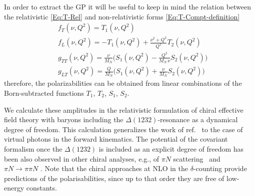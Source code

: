 \documentclass[prc,twocolumn,showpacs,preprintnumbers,amsmath,amssymb
,superscriptaddress,a4paper,nofootinbib
]{revtex4-1}
\begin{document}
In order to extract the GP it will be useful to keep in mind the relation between the relativistic \eqref{Eq:T-Rel} and non-relativistic forms \eqref{Eq:T-Compt-definition}
\begin{align}
 & f_T(\nu,Q^2) = T_1(\nu,Q^2) \label{Eq:fT-T1}\\
 & f_L(\nu,Q^2) = - T_1(\nu,Q^2) +  \frac{\nu^2 + Q^2}{Q^2} T_2(\nu,Q^2) \label{Eq:fL-T1T2}\\
 & g_{TT}(\nu, Q^2) = \frac{\nu}{M_N}\Big( S_1(\nu,Q^2) - \frac{Q^2}{M_N\,\nu} S_2(\nu,Q^2)\Big)\label{Eq:gTT-S1S2}\\
 & g_{LT}(\nu, Q^2) = \frac{Q}{M_N}\Big( S_1(\nu,Q^2) + \frac{\nu}{M_N} S_2(\nu,Q^2)\Big)\label{Eq:gLT-S1S2}
\end{align} 
therefore, the polarizabilities can be obtained from linear combinations of the Born-subtracted functions $T_1$, $T_2$, $S_1$, $S_2$. 


We calculate these amplitudes in the relativistic formulation of chiral effective field theory with baryons
including the $\Delta(1232)$-resonance as a dynamical degree of freedom.
This calculation generalizes the work of ref.~\cite{Lensky:2009uv} to the case of virtual photons in the forward kinematics.
The potential of the covariant formalism once the $\Delta(1232)$ is included as an explicit degree of freedom
has been also observed in other chiral analyses, e.g., of $\pi N$ scattering~\cite{Alarcon:2012kn,Chen:2012nx}
and $\pi N \to \pi \pi N$ \cite{Siemens:2014pma}. Note that the chiral approaches at NLO in the $\delta$-counting
provide predictions of the polarisabilities, since up to that order they are free of low-energy constants.
\end{document}
